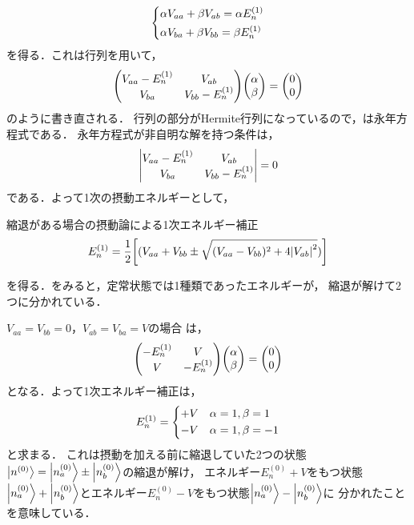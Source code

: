 \documentclass{report}
\begin{document}
  \begin{align}
    \begin{dcases}
      \alpha V_{aa} + \beta V_{ab} = \alpha E_n^{(1)}\\
      \alpha V_{ba} + \beta V_{bb} = \beta E_n^{(1)}
    \end{dcases}
  \end{align}
  を得る．これは行列を用いて，
  \begin{align}
    \mqty(
      V_{aa} - E_n^{(1)} & V_{ab} \\
      V_{ba} & V_{bb} - E_n^{(1)})
    \mqty(\alpha\\ \beta)
    =
    \mqty(0\\ 0)\label{secular-eq}
  \end{align}
  のように書き直される．
  行列の部分がHermite行列になっているので，は永年方程式である．
  永年方程式が非自明な解を持つ条件は，
  \begin{align}
    \mqty|
      V_{aa} - E_n^{(1)} &  V_{ab}\\
      V_{ba} & V_{bb} - E_n^{(1)}|
    = 0
  \end{align}
  である．よって1次の摂動エネルギーとして，
  \begin{itembox}[l]{縮退がある場合の摂動論による1次エネルギー補正}
    \begin{align}
      E_n^{(1)} = \frac{1}{2}\qty[(V_{aa} + V_{bb}\pm\sqrt{(V_{aa} - V_{bb})^2 + 4\abs{V_{ab}}^2})]\label{1st-order-energy-with-degeneracy}
    \end{align}
  \end{itembox}
  を得る．をみると，定常状態では1種類であったエネルギーが，
  縮退が解けて2つに分かれている．
  \begin{myex}{}{}
    $ V_{aa} = V_{bb} = 0$，$ V_{ab} = V_{ba} = V$の場合
    は，
    \begin{align}
      \mqty(
        -E_n^{(1)} &  V\\
        V & -E_n^{(1)})
      \mqty(\alpha\\\beta)
      = \mqty(0\\ 0)
    \end{align}
    となる．よって1次エネルギー補正は，
    \begin{align}
      E_n^{(1)}=
      \begin{dcases}
        + V & \alpha = 1, \beta = 1\\
        - V & \alpha = 1, \beta = -1
      \end{dcases}
    \end{align}
    と求まる．
    これは摂動を加える前に縮退していた2つの状態$\ket{n^{(0)}} = \ket{n_a^{(0)}}\pm\ket{n_b^{(0)}}$の縮退が解け，
    エネルギー$E_n^{(0)} +  V$をもつ状態$\ket{n_a^{(0)}} + \ket{n_b^{(0)}}$とエネルギー$E_n^{(0)} -  V$をもつ状態$\ket{n_a^{(0)}} - \ket{n_b^{(0)}}$に
    分かれたことを意味している．
  \end{myex}
\end{document}
